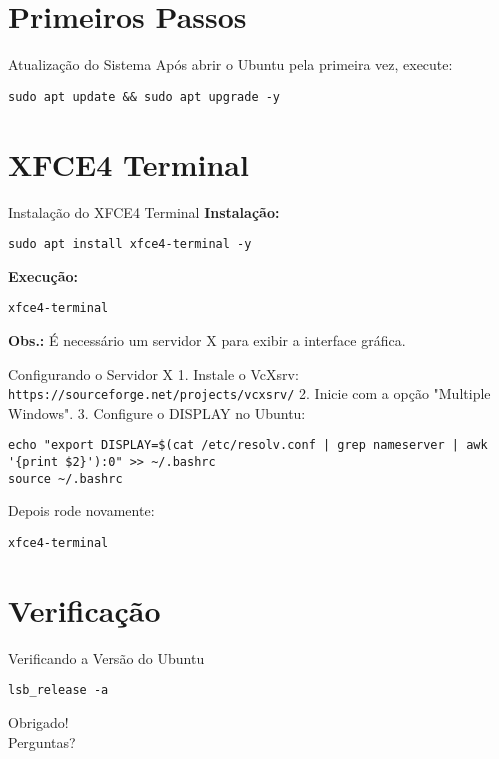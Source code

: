 \documentclass{beamer}
\begin{document}
\section{Primeiros Passos}
\begin{frame}{Atualização do Sistema}
Após abrir o Ubuntu pela primeira vez, execute:

\begin{verbatim}
sudo apt update && sudo apt upgrade -y
\end{verbatim}
\end{frame}

\section{XFCE4 Terminal}
\begin{frame}{Instalação do XFCE4 Terminal}
\textbf{Instalação:}
\begin{verbatim}
sudo apt install xfce4-terminal -y
\end{verbatim}

\textbf{Execução:}
\begin{verbatim}
xfce4-terminal
\end{verbatim}

\textbf{Obs.:} É necessário um servidor X para exibir a interface gráfica.
\end{frame}

\begin{frame}{Configurando o Servidor X}
1. Instale o VcXsrv: \texttt{https://sourceforge.net/projects/vcxsrv/}  
2. Inicie com a opção "Multiple Windows".  
3. Configure o DISPLAY no Ubuntu:

\begin{verbatim}
echo "export DISPLAY=$(cat /etc/resolv.conf | grep nameserver | awk '{print $2}'):0" >> ~/.bashrc
source ~/.bashrc
\end{verbatim}

Depois rode novamente:

\begin{verbatim}
xfce4-terminal
\end{verbatim}
\end{frame}

\section{Verificação}
\begin{frame}{Verificando a Versão do Ubuntu}
\begin{verbatim}
lsb_release -a
\end{verbatim}
\end{frame}

\begin{frame}
\centering
\Huge Obrigado!\\[0.3cm]
\Large Perguntas?
\end{frame}
\end{document}

